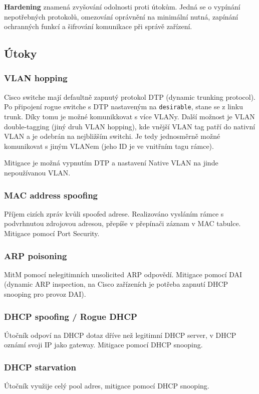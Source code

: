 \textbf{Hardening} znamená zvyšování odolnosti proti útokům. Jedná se o vypínání nepotřebných protokolů, omezování oprávnění na minimální nutná, zapínání ochranných funkcí a šifrování komunikace při správě zařízení.

\subsection{Útoky}
\subsubsection{VLAN hopping}
Cisco switche mají defaultně zapnutý protokol DTP (dynamic trunking protocol). Po připojení rogue switche s DTP nastaveným na \texttt{desirable}, stane se z linku trunk. Díky tomu je možné komunikkovat s více VLANy. Další možnost je VLAN double-tagging (jiný druh VLAN hopping), kde vnější VLAN tag patří do nativní VLAN a je odebrán na nejbližším switchi. Je tedy jednosměrně možné komunikovat s jiným VLANem (jeho ID je ve vnitřním tagu rámce).

Mitigace je možná vypnutím DTP a nastavení Native VLAN na jinde nepoužívanou VLAN.

\subsubsection{MAC address spoofing}
Příjem cizích zpráv kvůli spoofed adrese. Realizováno vysláním rámce s podvrhnutou zdrojovou adresou, přepíše v přepínači záznam v MAC tabulce. Mitigace pomocí Port Security.

\subsubsection{ARP poisoning}
MitM pomocí nelegitimních unsolicited ARP odpovědí. Mitigace pomocí DAI (dynamic ARP inspection, na Cisco zařízeních je potřeba zapnutí DHCP snooping pro provoz DAI).

\subsubsection{DHCP spoofing / Rogue DHCP}
Útočník odpoví na DHCP dotaz dříve než legitimní DHCP server, v DHCP oznámí svoji IP jako gateway. Mitigace pomocí DHCP snooping.

\subsubsection{DHCP starvation}
Útočník využije celý pool adres, mitigace pomocí DHCP snooping.

